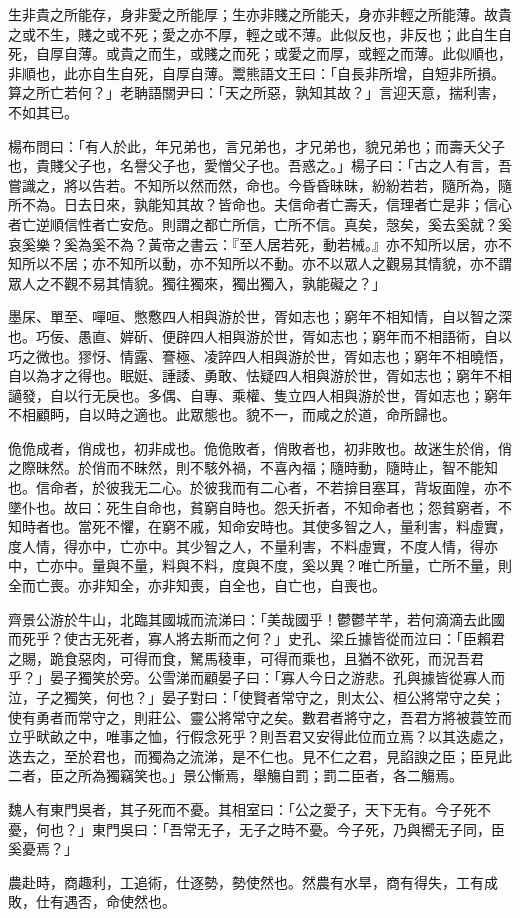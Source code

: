 \begin{pinyinscope}
生非貴之所能存，身非愛之所能厚；生亦非賤之所能夭，身亦非輕之所能薄。故貴之或不生，賤之或不死；愛之亦不厚，輕之或不薄。此似反也，非反也；此自生自死，自厚自薄。或貴之而生，或賤之而死；或愛之而厚，或輕之而薄。此似順也，非順也，此亦自生自死，自厚自薄。鬻熊語文王曰：「自長非所增，自短非所損。算之所亡若何？」老聃語關尹曰：「天之所惡，孰知其故？」言迎天意，揣利害，不如其已。

楊布問曰：「有人於此，年兄弟也，言兄弟也，才兄弟也，貌兄弟也；而壽夭父子也，貴賤父子也，名譽父子也，愛憎父子也。吾惑之。」楊子曰：「古之人有言，吾嘗識之，將以告若。不知所以然而然，命也。今昏昏昧昧，紛紛若若，隨所為，隨所不為。日去日來，孰能知其故？皆命也。夫信命者亡壽夭，信理者亡是非；信心者亡逆順信性者亡安危。則謂之都亡所信，亡所不信。真矣，愨矣，奚去奚就？奚哀奚樂？奚為奚不為？黃帝之書云：『至人居若死，動若械。』亦不知所以居，亦不知所以不居；亦不知所以動，亦不知所以不動。亦不以眾人之觀易其情貌，亦不謂眾人之不觀不易其情貌。獨往獨來，獨出獨入，孰能礙之？」

墨杘、單至、嘽咺、憋懯四人相與游於世，胥如志也；窮年不相知情，自以智之深也。巧佞、愚直、婩斫、便辟四人相與游於世，胥如志也；窮年而不相語術，自以巧之微也。㺒㤉、情露、謇極、凌誶四人相與游於世，胥如志也；窮年不相曉悟，自以為才之得也。眠娗、諈諉、勇敢、怯疑四人相與游於世，胥如志也；窮年不相讁發，自以行无戾也。多偶、自專、乘權、隻立四人相與游於世，胥如志也；窮年不相顧眄，自以時之適也。此眾態也。貌不一，而咸之於道，命所歸也。

佹佹成者，俏成也，初非成也。佹佹敗者，俏敗者也，初非敗也。故迷生於俏，俏之際昧然。於俏而不昧然，則不駭外禍，不喜內福；隨時動，隨時止，智不能知也。信命者，於彼我无二心。於彼我而有二心者，不若揜目塞耳，背坂面隍，亦不墜仆也。故曰：死生自命也，貧窮自時也。怨夭折者，不知命者也；怨貧窮者，不知時者也。當死不懼，在窮不戚，知命安時也。其使多智之人，量利害，料虛實，度人情，得亦中，亡亦中。其少智之人，不量利害，不料虛實，不度人情，得亦中，亡亦中。量與不量，料與不料，度與不度，奚以異？唯亡所量，亡所不量，則全而亡喪。亦非知全，亦非知喪，自全也，自亡也，自喪也。

齊景公游於牛山，北臨其國城而流涕曰：「美哉國乎！鬱鬱芊芊，若何滴滴去此國而死乎？使古无死者，寡人將去斯而之何？」史孔、梁丘據皆從而泣曰：「臣賴君之賜，跪食惡肉，可得而食，駑馬稜車，可得而乘也，且猶不欲死，而況吾君乎？」晏子獨笑於旁。公雪涕而顧晏子曰：「寡人今日之游悲。孔與據皆從寡人而泣，子之獨笑，何也？」晏子對曰：「使賢者常守之，則太公、桓公將常守之矣；使有勇者而常守之，則莊公、靈公將常守之矣。數君者將守之，吾君方將被蓑笠而立乎畎畝之中，唯事之恤，行假念死乎？則吾君又安得此位而立焉？以其迭處之，迭去之，至於君也，而獨為之流涕，是不仁也。見不仁之君，見諂諛之臣；臣見此二者，臣之所為獨竊笑也。」景公慚焉，舉觴自罰；罰二臣者，各二觴焉。

魏人有東門吳者，其子死而不憂。其相室曰：「公之愛子，天下无有。今子死不憂，何也？」東門吳曰：「吾常无子，无子之時不憂。今子死，乃與嚮无子同，臣奚憂焉？」

農赴時，商趣利，工追術，仕逐勢，勢使然也。然農有水旱，商有得失，工有成敗，仕有遇否，命使然也。


\end{pinyinscope}